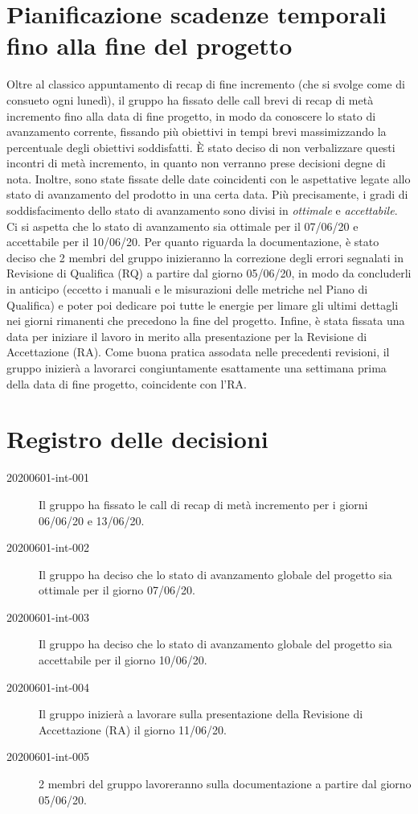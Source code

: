 \documentclass{article}
\begin{document}
\section{Pianificazione scadenze temporali fino alla fine del progetto}%
\label{sec:pianificazione_scadenze_temporali_fino_alla_fine_del_progetto}
Oltre al classico appuntamento di recap di fine incremento (che si svolge come di consueto ogni lunedì), il gruppo ha fissato delle call brevi di recap di metà incremento fino alla data di fine progetto, in modo da conoscere lo stato di avanzamento corrente, fissando più obiettivi in tempi brevi massimizzando la percentuale degli obiettivi soddisfatti. È stato deciso di non verbalizzare questi incontri di metà incremento, in quanto non verranno prese decisioni degne di nota.
Inoltre, sono state fissate delle date coincidenti con le aspettative legate allo stato di avanzamento del prodotto in una certa data. Più precisamente, i gradi di soddisfacimento dello stato di avanzamento sono divisi in \textit{ottimale} e \textit{accettabile}. Ci si aspetta che lo stato di avanzamento sia ottimale per il 07/06/20 e accettabile per il 10/06/20.
Per quanto riguarda la documentazione, è stato deciso che 2 membri del gruppo inizieranno la correzione degli errori segnalati in Revisione di Qualifica (RQ) a partire dal giorno 05/06/20, in modo da concluderli in anticipo (eccetto i manuali e le misurazioni delle metriche nel Piano di Qualifica) e poter poi dedicare poi tutte le energie per limare gli ultimi dettagli nei giorni rimanenti che precedono la fine del progetto.
Infine, è stata fissata una data per iniziare il lavoro in merito alla presentazione per la Revisione di Accettazione (RA). Come buona pratica assodata nelle precedenti revisioni, il gruppo inizierà a lavorarci congiuntamente esattamente una settimana prima della data di fine progetto, coincidente con l'RA\@.

\newpage
\section{Registro delle decisioni}%
\label{sec:registro_delle_decisioni}

\begin{description}
  \item[20200601-int-001] Il gruppo ha fissato le call di recap di metà incremento per i giorni 06/06/20 e 13/06/20.
  \item[20200601-int-002] Il gruppo ha deciso che lo stato di avanzamento globale del progetto sia ottimale per il giorno 07/06/20.
  \item[20200601-int-003] Il gruppo ha deciso che lo stato di avanzamento globale del progetto sia accettabile per il giorno 10/06/20.
  \item[20200601-int-004] Il gruppo inizierà a lavorare sulla presentazione della Revisione di Accettazione (RA) il giorno 11/06/20.
  \item[20200601-int-005] 2 membri del gruppo lavoreranno sulla documentazione a partire dal giorno 05/06/20.
\end{description}

\end{document}
